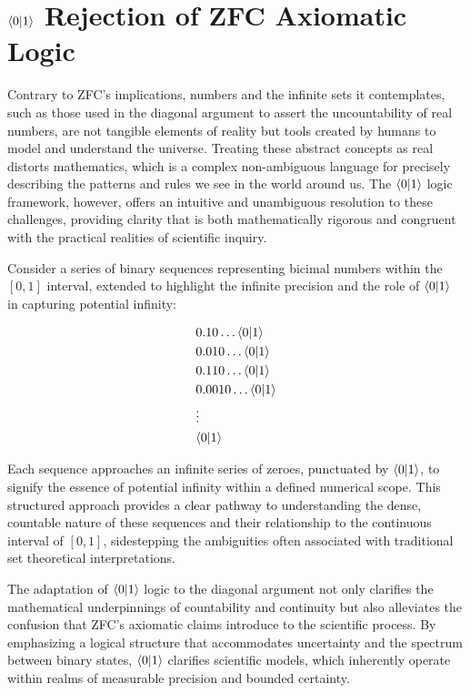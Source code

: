 \documentclass[12pt]{article}
\begin{document}
\section*{\(\langle 0 | 1 \rangle\) Rejection of ZFC Axiomatic Logic}

Contrary to ZFC's implications, numbers and the infinite sets it contemplates, such as those used in the diagonal argument to assert the uncountability of real numbers, are not tangible elements of reality but tools created by humans to model and understand the universe. Treating these abstract concepts as real distorts mathematics, which is a complex non-ambiguous language for precisely describing the patterns and rules we see in the world around us. The \(\langle 0 | 1 \rangle\) logic framework, however, offers an intuitive and unambiguous resolution to these challenges, providing clarity that is both mathematically rigorous and congruent with the practical realities of scientific inquiry.

Consider a series of binary sequences representing bicimal numbers within the \([0,1]\) interval, extended to highlight the infinite precision and the role of \(\langle 0 | 1 \rangle\) in capturing potential infinity:

\begin{align*}
     & 0.10\ldots\langle 0 | 1 \rangle   \\
     & 0.010\ldots\langle 0 | 1 \rangle  \\
     & 0.110\ldots\langle 0 | 1 \rangle  \\
     & 0.0010\ldots\langle 0 | 1 \rangle \\
     & \vdots            \\
     & \langle 0 | 1 \rangle
\end{align*}

Each sequence approaches an infinite series of zeroes, punctuated by \(\langle 0 | 1 \rangle\), to signify the essence of potential infinity within a defined numerical scope. This structured approach provides a clear pathway to understanding the dense, countable nature of these sequences and their relationship to the continuous interval of \([0,1]\), sidestepping the ambiguities often associated with traditional set theoretical interpretations.

The adaptation of \(\langle 0 | 1 \rangle\) logic to the diagonal argument not only clarifies the mathematical underpinnings of countability and continuity but also alleviates the confusion that ZFC's  axiomatic claims introduce to the scientific process. By emphasizing a logical structure that accommodates uncertainty and the spectrum between binary states, \(\langle 0 | 1 \rangle\) clarifies scientific models, which inherently operate within realms of measurable precision and bounded certainty.
\end{document}
